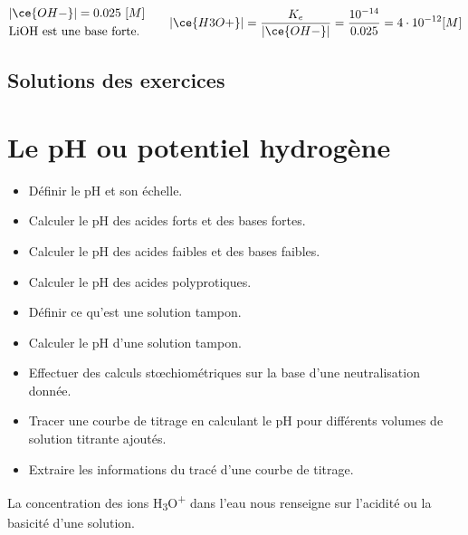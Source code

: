 \documentclass[
  11pt,
  a4paper,
  openany]{book}
\providecommand{\tightlist}{%
  \setlength{\itemsep}{0pt}\setlength{\parskip}{0pt}}
\begin{document}
\begin{Answer}
\[
\begin{split}
&|\ce{OH-}| = 0.025\ [M] \\
&\text{LiOH est une base forte.}
\end{split}
\qquad
\begin{split}
|\ce{H3O+}| = \frac{K_e}{|\ce{OH-}|} = \frac{10^{-14}}{0.025} = 4 \cdot 10^{-12} [M]
\end{split}
\]

\end{Answer}

\clearpage

\section{Solutions des exercices} \shipoutAnswer

\chapter{Le pH ou potentiel hydrogène}\label{le-ph-ou-potentiel-hydroguxe8ne}

\begin{objectives}

\begin{itemize}
\tightlist
\item
  Définir le pH et son échelle.
\item
  Calculer le pH des acides forts et des bases fortes.
\item
  Calculer le pH des acides faibles et des bases faibles.
\item
  Calculer le pH des acides polyprotiques.
\item
  Définir ce qu'est une solution tampon.
\item
  Calculer le pH d'une solution tampon.
\item
  Effectuer des calculs stœchiométriques sur la base d'une neutralisation donnée.
\item
  Tracer une courbe de titrage en calculant le pH pour différents volumes de solution titrante ajoutés.
\item
  Extraire les informations du tracé d'une courbe de titrage.
\end{itemize}

\end{objectives}

La concentration des ions H\textsubscript{3}O\textsuperscript{+} dans l'eau nous renseigne sur l'acidité ou la basicité d'une solution.
\end{document}
